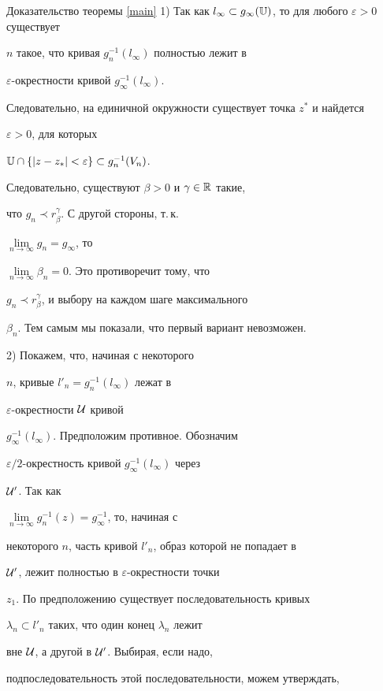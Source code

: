\begin{pf*}{Доказательство теоремы \ref{main}}
1) Так как $l_\infty\subset


g_\infty(\Bbb U)$, то для любого $\varepsilon>0$ существует


$n$ такое, что кривая $g_n^{-1}(l_\infty)$ полностью лежит в


$\varepsilon$-окрестности кривой $g^{-1}_\infty(l_\infty)$.


Следовательно, на единичной окружности существует точка $z^*$ и найдется


$\varepsilon>0$, для которых


$\Bbb{U}\cap\{|z-z_*|<\varepsilon\}\subset g_n^{-1}(V_n)$.


Следовательно, существуют $\beta>0$ и $\gamma\in\Bbb R$ такие,


что $g_{n}\prec r_\beta^\gamma$. С другой стороны, т.\,к.


$\lim\limits_{n\to\infty}g_n=g_\infty$, то


$\lim\limits_{n\to\infty}\beta_n=0$. Это противоречит тому, что


$g_{n}\prec r_\beta^\gamma$, и выбору на каждом шаге максимального


$\beta_n$. Тем самым мы показали, что первый вариант невозможен.





2) Покажем, что, начиная с некоторого


$n$, кривые $l'_n=g^{-1}_n(l_\infty)$ лежат в


$\varepsilon$-окрестности $\cal U$ кривой


$g^{-1}_\infty(l_\infty)$. Предположим противное. Обозначим


$\varepsilon/2$-окрестность кривой $g^{-1}_\infty(l_\infty)$ через


$\cal U'$. Так как


$\lim\limits_{n\to\infty}g^{-1}_n(z)=g^{-1}_\infty$, то, начиная с


некоторого $n$, часть кривой $l'_n$, образ которой не попадает в


$\cal U'$, лежит полностью в $\varepsilon$-окрестности точки


$z_1$. По предположению существует последовательность кривых


$\lambda_n\subset l'_n$ таких, что один конец $\lambda_n$ лежит


вне $\cal U$, а другой в $\cal U'$. Выбирая, если надо,


подпоследовательность этой последовательности, можем утверждать,



\end{pf*}
